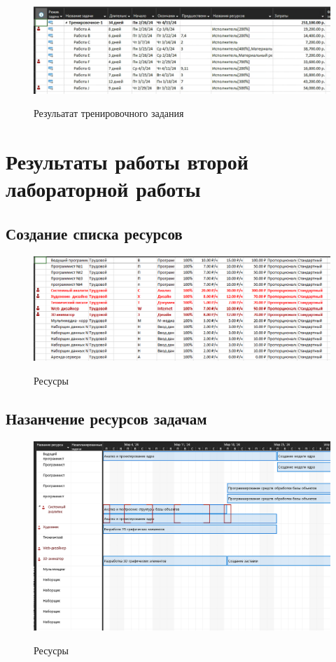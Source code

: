 \begin{figure}[ht!]
	\includegraphics[width=\linewidth]{assets/images/Screenshot 2024-02-27 at 14.27.24.png}
	\label{fig:r2}
	\caption{Резульатат тренировочного задания}
\end{figure}
\FloatBarrier

\section{Результаты работы второй лабораторной работы}

\subsection{Создание списка ресурсов}

\begin{figure}[ht!]
	\includegraphics[width=0.75\linewidth]{assets/images/image_2024-02-27_09-33-23.png}
	\label{fig:r2}
	\caption{Ресусры}
\end{figure}
\FloatBarrier

\subsection{Назанчение ресурсов задачам}

\begin{figure}[ht!]
	\includegraphics[width=0.75\linewidth]{assets/images/image_2024-02-27_09-35-16.png}
	\label{fig:r2}
	\caption{Ресусры}
\end{figure}
\FloatBarrier

